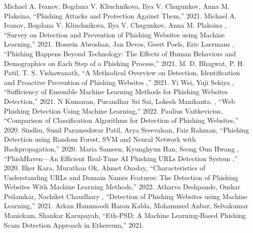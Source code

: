 \documentclass[conference]{IEEEtran}
\begin{document}
\begin{thebibliography}{00}
Michael A. Ivanov,  Bogdana V. Kliuchnikova,  Ilya V. Chugunkov,  Anna M. Plaksina, ``Phishing Attacks and Protection Against Them,'' 2021.
Michael A. Ivanov,  Bogdana V. Kliuchnikova,  Ilya V. Chugunkov,  Anna M. Plaksina
 , ``Survey on Detection and Prevention of Phishing Websites using Machine Learning,'' 2021.
Hossein Abroshan, Jan Devos, Geert Poels, Eric Laermans
 , ``Phishing Happens Beyond Technology: The Effects of Human Behaviors and Demographics on Each Step of a Phishing Process,'' 2021.
 M. D. Bhagwat, P. H. Patil, T. S. Vishawanath, ``A Methodical Overview on Detection, Identification and Proactive Prevention of Phishing Websites
,'' 2021.
 Yi Wei, Yuji Sekiya
, ``Sufficiency of Ensemble Machine Learning Methods for Phishing Websites Detection,'' 2021.
 N Kumaran, Purandhar
Sri Sai, Lokesh Manikanta.
, ``Web Phishing Detection Using Machine Learning,'' 2022.
 Paulius Vaitkevicius, ``Comparison of Classification Algorithms for Detection of Phishing Websites,'' 2020.
 Sindhu, Sunil Parameshwar Patil, Arya Sreevalsan, Faiz Rahman, ``Phishing Detection using Random Forest, SVM and Neural Network with Backpropagation,'' 2020.
Maria Sameen, Kyunghyun Han, Seong Oun Hwang , ``PhishHaven—An Efficient Real-Time AI Phishing URLs Detection System 
,'' 2020.
 Ilker Kara, Murathan Ok, Ahmet Ozaday, ``Characteristics of Understanding URLs and Domain Names Features: The Detection of Phishing Websites With Machine Learning Methods,'' 2022.
 Atharva Deshpande, Omkar Pedamkar, Nachiket Chaudhary , ``Detection of Phishing Websites using Machine Learning,'' 2021.
 Arkan Hammoodi Hasan Kabla, Mohammed Anbar, Selvakumar Manickam, Shankar Karupayah, ``Eth-PSD: A Machine Learning-Based Phishing Scam Detection Approach in Ethereum,'' 2021.
\end{thebibliography}
\end{document}
